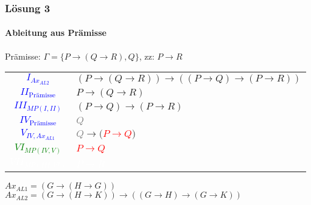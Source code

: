 \begin{frame}
	\frametitle{Lösung 3}
	\framesubtitle{Ableitung aus Prämisse}
	Prämisse: $\Gamma =\{P\rightarrow(Q\rightarrow R), Q\}$, zz: $P\rightarrow R$\\
	\begin{tabular}{cl}
		\textcolor{blue}{$I_{Ax_{AL2}}$}         & $(P\rightarrow(Q\rightarrow R))\rightarrow((P\rightarrow Q)\rightarrow(P\rightarrow R))$ \\
		\textcolor{blue}{$II_{\text{Prämisse}}$} & $P\rightarrow(Q\rightarrow R)$                                                           \\
		\textcolor{blue}{$III_{MP(I, II)}$}      & $(P\rightarrow Q)\rightarrow(P\rightarrow R)$                                            \\
		\textcolor{blue}{$IV_{\text{Prämisse}}$} & \textcolor{gray}{$Q$}                                                                    \\
		\textcolor{blue}{$V_{IV, Ax_{AL1}}$}     & \textcolor{gray}{$Q$}$\rightarrow($\textcolor{red}{$P\rightarrow Q$}$)$                  \\
		\textcolor{green}{$VI_{MP(IV, V)}$}      & \textcolor{red}{$P\rightarrow Q$}                                                        \\
		\textcolor{white}{$VII_{MP(III, VI)}$}   & \textcolor{white}{$P\rightarrow R$}                                                      \\
	\end{tabular}
	$Ax_{AL1} = (G\rightarrow(H\rightarrow G))$\\
	$Ax_{AL2} = (G\rightarrow(H\rightarrow K))\rightarrow((G\rightarrow H)\rightarrow(G\rightarrow K))$\\
\end{frame}
